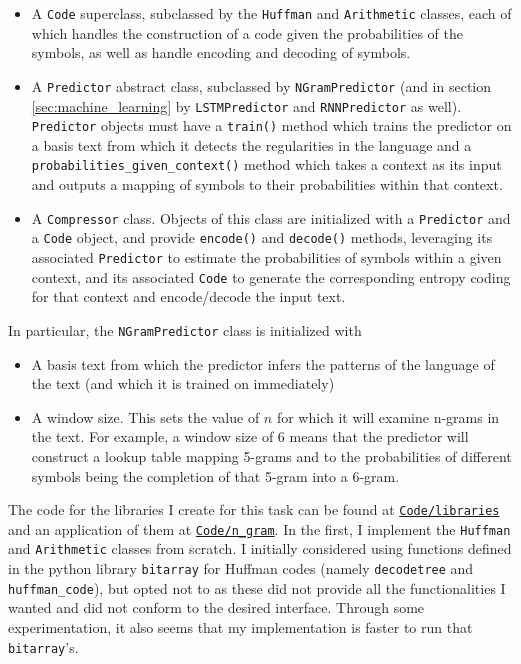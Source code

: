 \begin{itemize}
  \item A \texttt{Code} superclass, subclassed by the \texttt{Huffman} and \texttt{Arithmetic} classes, each of which handles the construction of a code given the probabilities of the symbols, as well as handle encoding and decoding of symbols.
  \item A \texttt{Predictor} abstract class, subclassed by \texttt{NGramPredictor} (and in section \ref{sec:machine_learning} by \texttt{LSTMPredictor} and \texttt{RNNPredictor} as well). \texttt{Predictor} objects must have a \texttt{train()} method which trains the predictor on a basis text from which it detects the regularities in the language and a \texttt{probabilities\_given\_context()} method which takes a context as its input and outputs a mapping of symbols to their probabilities within that context.
  \item A \texttt{Compressor} class. Objects of this class are initialized with a \texttt{Predictor} and a \texttt{Code} object, and provide \texttt{encode()} and \texttt{decode()} methods, leveraging its associated \texttt{Predictor} to estimate the probabilities of symbols within a given context, and its associated \texttt{Code} to generate the corresponding entropy coding for that context and encode/decode the input text.
\end{itemize}

In particular, the \texttt{NGramPredictor} class is initialized with
\begin{itemize}
  \item A basis text from which the predictor infers the patterns of the language of the text (and which it is trained on immediately)
  \item A window size. This sets the value of $n$ for which it will examine n-grams in the text. For example, a window size of 6 means that the predictor will construct a lookup table mapping 5-grams and to the probabilities of different symbols being the completion of that 5-gram into a 6-gram.
\end{itemize}

The code for the libraries I create for this task can be found at \texttt{\href{https://github.com/Guy29/FYP/blob/main/Code/libraries}{Code/libraries}} and an application of them at \texttt{\href{https://github.com/Guy29/FYP/blob/main/Code/n_gram}{Code/n\_gram}}. In the first, I implement the \texttt{Huffman} and \texttt{Arithmetic} classes from scratch. I initially considered using functions defined in the python library \texttt{bitarray} for Huffman codes (namely \texttt{decodetree} and \texttt{huffman\_code}), but opted not to as these did not provide all the functionalities I wanted and did not conform to the desired interface. Through some experimentation, it also seems that my implementation is faster to run that \texttt{bitarray}'s.

